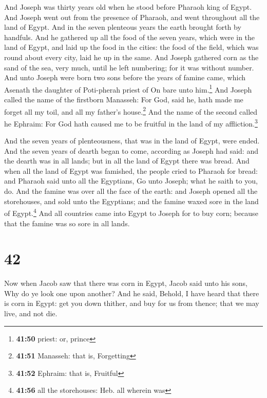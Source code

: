  And Joseph was thirty years old when he stood before
Pharaoh king of Egypt. And Joseph went out from the presence of Pharaoh,
and went throughout all the land of Egypt.  And in the
seven plenteous years the earth brought forth by handfuls.
 And he gathered up all the food of the seven years,
which were in the land of Egypt, and laid up the food in the cities: the
food of the field, which was round about every city, laid he up in the
same.  And Joseph gathered corn as the sand of the sea,
very much, until he left numbering; for it was without number.
 And unto Joseph were born two sons before the years of
famine came, which Asenath the daughter of Poti-pherah priest of On bare
unto him.\footnote{\textbf{41:50} priest: or, prince} 
And Joseph called the name of the firstborn Manasseh: For God, said he,
hath made me forget all my toil, and all my father's house.\footnote{\textbf{41:51}
  Manasseh: that is, Forgetting}  And the name of the
second called he Ephraim: For God hath caused me to be fruitful in the
land of my affliction.\footnote{\textbf{41:52} Ephraim: that is,
  Fruitful}

 And the seven years of plenteousness, that was in the
land of Egypt, were ended.  And the seven years of dearth
began to come, according as Joseph had said: and the dearth was in all
lands; but in all the land of Egypt there was bread.  And
when all the land of Egypt was famished, the people cried to Pharaoh for
bread: and Pharaoh said unto all the Egyptians, Go unto Joseph; what he
saith to you, do.  And the famine was over all the face
of the earth: and Joseph opened all the storehouses, and sold unto the
Egyptians; and the famine waxed sore in the land of Egypt.\footnote{\textbf{41:56}
  all the storehouses: Heb. all wherein was}  And all
countries came into Egypt to Joseph for to buy corn; because that the
famine was so sore in all lands.

\hypertarget{section-41}{%
\section{42}\label{section-41}}

 Now when Jacob saw that there was corn in Egypt, Jacob
said unto his sons, Why do ye look one upon another?  And
he said, Behold, I have heard that there is corn in Egypt: get you down
thither, and buy for us from thence; that we may live, and not die.

